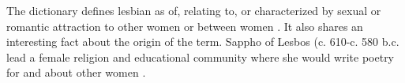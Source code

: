 The dictionary defines lesbian as of, relating to, or characterized by sexual 
or romantic attraction to other women or between women \cite{lesbian-def}. It 
also shares an interesting fact about the origin of the term. Sappho of Lesbos 
(c. 610-c. 580 b.c. lead a female religion and educational community where she 
would write poetry for and about other women \cite{lesbian-def}.
